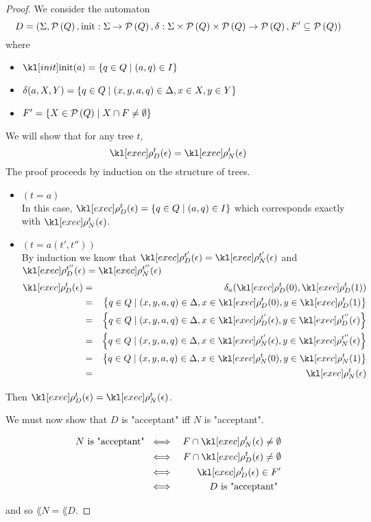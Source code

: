 \documentclass{article}
\begin{document}
\begin{proof}
	We consider the automaton
	\[ D = (\Sigma, \mathcal{P}\left(Q\right), \text{init} : \Sigma \to \mathcal{P}\left(Q\right), \delta : \Sigma \times \mathcal{P}\left(Q\right) \times \mathcal{P}\left(Q\right) \to \mathcal{P}\left(Q\right), F' \subseteq \mathcal{P}\left(Q\right)) \]
	where
	\begin{itemize}
		\item $\init (a) = \setdef {q \in Q} {(a,q) \in I}$
		\item $\delta (a, X, Y) = \left\{q \in  Q \mid (x,y,a,q) \in \Delta, x \in X, y \in Y\right\}$
		\item $F' = \left\{X \in \mathcal{P}\left(Q\right) \mid X \cap F \neq \emptyset\right\}$
	\end{itemize}

	We will show that for any tree $t$,
	\[ \exec D  t (\epsilon)  = \exec N t (\epsilon) \]
	The proof proceeds by induction on the structure of trees.
	\begin{itemize}
		\item $(t = a)$\\
		      In this case, $\exec D t (\epsilon) = \setdef {q \in Q} {(a,q) \in I}$ which corresponds
		      exactly with $\exec N  t (\epsilon)$.

		\item $(t = a(t',t''))$\\
		      By induction we know that
		      $\exec D {t'} (\epsilon) = \exec N {t'} (\epsilon)$
		      and
		      $\exec D {t''} (\epsilon) =  \exec N {t''} (\epsilon)$
		      \begin{eqnarray*}
			      \exec D t (\epsilon) &=& \delta_a(\exec D t (0), \exec D t (1)) \\
			      &=& \setdef {q \in  Q} {(x,y,a,q) \in \Delta, x \in \exec D t (0), y \in \exec D t (1)}\\
			      &=& \setdef {q \in  Q} {(x,y,a,q) \in \Delta, x \in \exec D {t'} (\epsilon), y \in \exec D {t''} (\epsilon)}\\
			      &=& \setdef {q \in  Q} {(x,y,a,q) \in \Delta, x \in \exec N {t'} (\epsilon), y \in \exec N {t''} (\epsilon)}\\
			      &=& \setdef {q \in  Q} {(x,y,a,q) \in \Delta, x \in \exec N t (0), y \in \exec N t (1)}\\
			      &=& \exec N t (\epsilon)
		      \end{eqnarray*}
	\end{itemize}
	Then $ \exec D t (\epsilon)  = \exec N t (\epsilon)$.

	We must now show that $D$ is "acceptant" iff $N$ is "acceptant".

	\begin{eqnarray*}
		N \text{ is "acceptant" } &\iff& F \cap \exec N t (\epsilon) \neq \emptyset \\
		&\iff& F \cap \exec D t (\epsilon) \neq \emptyset \\
		&\iff& \exec D t (\epsilon) \in F' \\
		&\iff& D \text{ is "acceptant" }
	\end{eqnarray*}

	and so $\lang N = \lang D$.

\end{proof}
\end{document}
